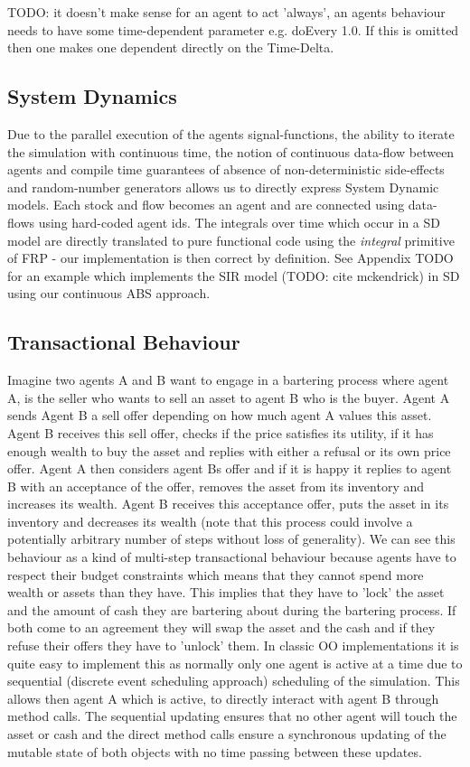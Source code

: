 TODO: it doesn't make sense for an agent to act 'always', an agents behaviour needs to have some time-dependent parameter e.g. doEvery 1.0. If this is omitted then one makes one dependent directly on the Time-Delta.

\subsection{System Dynamics}
Due to the parallel execution of the agents signal-functions, the ability to iterate the simulation with continuous time, the notion of continuous data-flow between agents and compile time guarantees of absence of non-deterministic side-effects and random-number generators allows us to directly express System Dynamic models.
Each stock and flow becomes an agent and are connected using data-flows using hard-coded agent ids. The integrals over time which occur in a SD model are directly translated to pure functional code using the \textit{integral} primitive of FRP - our implementation is then correct by definition.
See Appendix TODO for an example which implements the SIR model (TODO: cite mckendrick) in SD using our continuous ABS approach.

\subsection{Transactional Behaviour}
Imagine two agents A and B want to engage in a bartering process where agent A, is the seller who wants to sell an asset to agent B who is the buyer. Agent A sends Agent B a sell offer depending on how much agent A values this asset. Agent B receives this sell offer, checks if the price satisfies its utility, if it has enough wealth to buy the asset and replies with either a refusal or its own price offer. Agent A then considers agent Bs offer and if it is happy it replies to agent B with an acceptance of the offer, removes the asset from its inventory and increases its wealth. Agent B receives this acceptance offer, puts the asset in its inventory and decreases its wealth (note that this process could involve a potentially arbitrary number of steps without loss of generality).
We can see this behaviour as a kind of multi-step transactional behaviour because agents have to respect their budget constraints which means that they cannot spend more wealth or assets than they have. This implies that they have to 'lock' the asset and the amount of cash they are bartering about during the bartering process. If both come to an agreement they will swap the asset and the cash and if they refuse their offers they have to 'unlock' them.
In classic OO implementations it is quite easy to implement this as normally only one agent is active at a time due to sequential (discrete event scheduling approach) scheduling of the simulation. This allows then agent A which is active, to directly interact with agent B through method calls. The sequential updating ensures that no other agent will touch the asset or cash and the direct method calls ensure a synchronous updating of the mutable state of both objects with no time passing between these updates.

